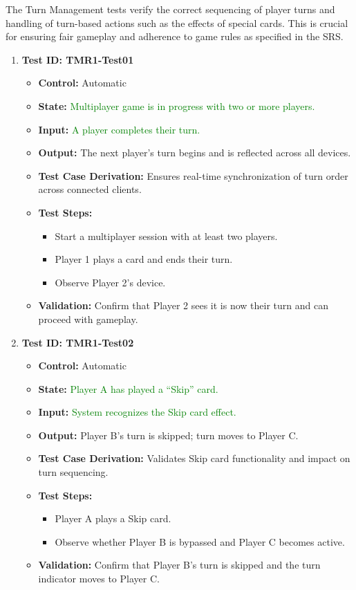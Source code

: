 \documentclass[12pt]{article}
\newcommand{\added}[1]{\textcolor{green}{#1}}
\begin{document}
The Turn Management tests verify the correct sequencing of player turns and handling of turn-based actions such as the effects of special cards. This is crucial for ensuring fair gameplay and adherence to game rules as specified in the SRS.

\begin{enumerate}
    \item \textbf{Test ID: TMR1-Test01}
    \begin{itemize}
        \item \textbf{Control:} Automatic
        \item \textbf{State:} \added{Multiplayer game is in progress with two or more players.}
        \item \textbf{Input:} \added{A player completes their turn.}
        \item \textbf{Output:} The next player’s turn begins and is reflected across all devices.
        \item \textbf{Test Case Derivation:} Ensures real-time synchronization of turn order across connected clients.
        \item \textbf{Test Steps:}
        \begin{itemize}
            \item Start a multiplayer session with at least two players.
            \item Player 1 plays a card and ends their turn.
            \item Observe Player 2’s device.
        \end{itemize}
        \item \textbf{Validation:} Confirm that Player 2 sees it is now their turn and can proceed with gameplay.
    \end{itemize}

    \item \textbf{Test ID: TMR1-Test02}
    \begin{itemize}
        \item \textbf{Control:} Automatic
        \item \textbf{State:} \added{Player A has played a “Skip” card.}
        \item \textbf{Input:} \added{System recognizes the Skip card effect.}
        \item \textbf{Output:} Player B’s turn is skipped; turn moves to Player C.
        \item \textbf{Test Case Derivation:} Validates Skip card functionality and impact on turn sequencing.
        \item \textbf{Test Steps:}
        \begin{itemize}
            \item Player A plays a Skip card.
            \item Observe whether Player B is bypassed and Player C becomes active.
        \end{itemize}
        \item \textbf{Validation:} Confirm that Player B's turn is skipped and the turn indicator moves to Player C.
    \end{itemize}


\end{enumerate}
\end{document}
